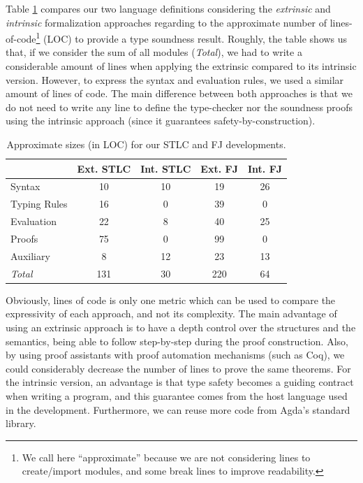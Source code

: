 \documentclass[tese,capa,english]{texufpel}
\begin{document}
Table \ref{tab:loc} compares our two language definitions considering the \emph{extrinsic} and \emph{intrinsic} formalization approaches regarding to the approximate number of lines-of-code\footnote{We call here ``approximate'' because we are not considering lines to create/import modules, and some break lines to improve readability.} (LOC) to provide a type soundness result. Roughly, the table shows us that, if we consider the sum of all modules (\emph{Total}), we had to write a considerable amount of lines when applying the extrinsic compared to its intrinsic version. However, to express the syntax and evaluation rules, we used a similar amount of lines of code. The main difference between both approaches is that we do not need to write any line to define the type-checker nor the soundness proofs using the intrinsic approach (since it guarantees safety-by-construction). 

\begin{table}[!htb]
\begin{center}
\begin{tabular}{lcccc}    
\hline
             & Ext. STLC & Int. STLC & Ext. FJ & Int. FJ \\ \hline
Syntax       & 10           & 10           & 19           & 26           \\
Typing Rules & 16           & 0            & 39           & 0            \\
Evaluation   & 22           & 8            & 40           & 25           \\
Proofs       & 75           & 0            & 99           & 0            \\ 
Auxiliary & 8           & 12           & 23           & 13           \\ \hline 
\emph{Total} & 131          & 30           & 220          & 64           \\ \hline
\end{tabular}
\caption{Approximate sizes (in LOC) for our STLC and FJ developments.}
\label{tab:loc}
\end{center}
\end{table}

Obviously, lines of code is only one metric which can be used to compare the expressivity of each approach, and not its complexity. The main advantage of using an extrinsic approach is to have a depth control over the structures and the semantics, being able to follow step-by-step during the proof construction. Also, by using proof assistants with proof automation mechanisms (such as Coq), we could considerably decrease the number of lines to prove the same theorems. For the intrinsic version, an advantage is that type safety becomes a guiding contract when writing a program, and this guarantee comes from the host language used in the development. Furthermore, we can reuse more code from Agda's standard library.
\end{document}
